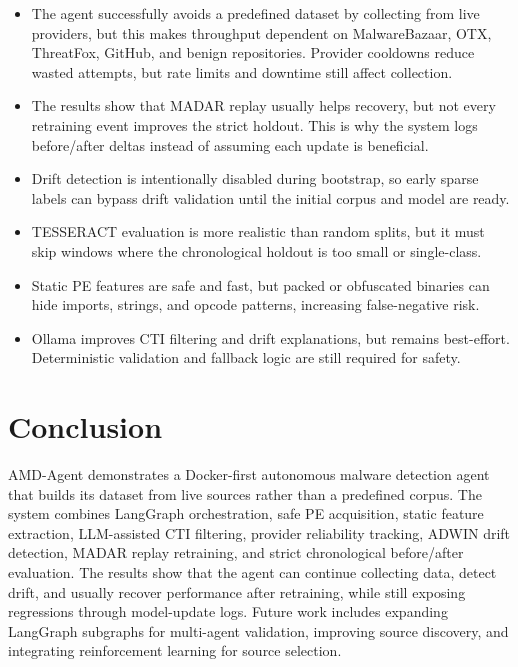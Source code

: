 \documentclass[letterpaper,10pt,conference]{ieeeconf}
\begin{document}
\begin{itemize}
  \item The agent successfully avoids a predefined dataset by collecting from live providers, but this makes throughput dependent on MalwareBazaar, OTX, ThreatFox, GitHub, and benign repositories. Provider cooldowns reduce wasted attempts, but rate limits and downtime still affect collection.

  \item The results show that MADAR replay usually helps recovery, but not every retraining event improves the strict holdout. This is why the system logs before/after deltas instead of assuming each update is beneficial.

  \item Drift detection is intentionally disabled during bootstrap, so early sparse labels can bypass drift validation until the initial corpus and model are ready.

  \item TESSERACT evaluation is more realistic than random splits, but it must skip windows where the chronological holdout is too small or single-class.

  \item Static PE features are safe and fast, but packed or obfuscated binaries can hide imports, strings, and opcode patterns, increasing false-negative risk.

  \item Ollama improves CTI filtering and drift explanations, but remains best-effort. Deterministic validation and fallback logic are still required for safety.


\end{itemize}

\section{Conclusion}
AMD-Agent demonstrates a Docker-first autonomous malware detection agent that builds its dataset from live sources rather than a predefined corpus. The system combines LangGraph orchestration, safe PE acquisition, static feature extraction, LLM-assisted CTI filtering, provider reliability tracking, ADWIN drift detection, MADAR replay retraining, and strict chronological before/after evaluation. The results show that the agent can continue collecting data, detect drift, and usually recover performance after retraining, while still exposing regressions through model-update logs. Future work includes expanding LangGraph subgraphs for multi-agent validation, improving source discovery, and integrating reinforcement learning for source selection.



\end{document}
